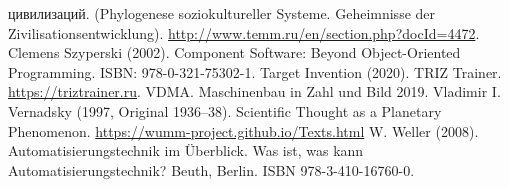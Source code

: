 \documentclass[11pt,a4paper]{article}
\begin{document}
\begin{thebibliography}{xxx}
{    цивилизаций}.  (Phylogenese soziokultureller Systeme. Geheimnisse der
  Zivilisationsentwicklung).
  \url{http://www.temm.ru/en/section.php?docId=4472}.
 Clemens Szyperski (2002). Component Software: Beyond
  Object-Oriented Programming. ISBN: 978-0-321-75302-1.
 Target Invention (2020). TRIZ Trainer.
  \url{https://triztrainer.ru}.
 VDMA. Maschinenbau in Zahl und Bild 2019. 
 Vladimir I. Vernadsky (1997, Original 1936--38).
  Scientific Thought as a Planetary Phenomenon.
  \url{https://wumm-project.github.io/Texts.html}
 W. Weller (2008). Automatisierungstechnik im
  Überblick. Was ist, was kann Automatisierungstechnik? Beuth, Berlin. ISBN
  978-3-410-16760-0.
\end{thebibliography}
\end{document}
